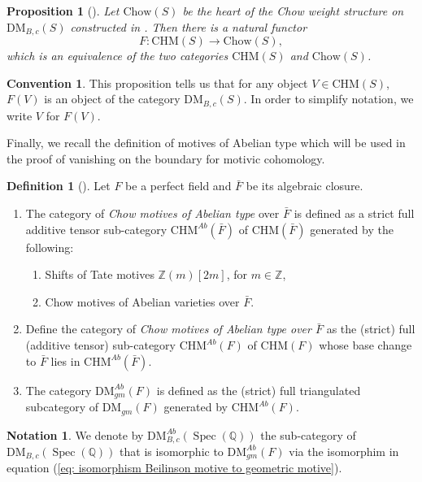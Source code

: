 \documentclass[11pt, a4paper]{amsart}
\theoremstyle{plain}
\newtheorem{proposition}[theorem]{Proposition}
\theoremstyle{definition}
\newtheorem{definition}[theorem]{Definition}
\newtheorem{convention}[theorem]{Convention}
\newtheorem{notation}[theorem]{Notation}
\numberwithin{equation}{section}
\def\QQ{\mathbb{Q}}
\def\ZZ{\mathbb{Z}}
\DeclareMathOperator{\Spec}{Spec}
\begin{document}
 \begin{proposition}[{\cite[Theorem 3.17]{Jin16}}]
 \label{Prop: Jin}
 Let $\mathrm{Chow}(S)$ be the heart of the Chow weight structure on $\mathrm{DM}_{B,c}(S)$ constructed in \textnormal{\cite[Th\'{e}or\`{e}me 3.3.]{Hebert10}}. Then there is a natural functor 
 \[
        F \colon \mathrm{CHM}(S) \rightarrow \mathrm{Chow}(S),
 \]
 which is an equivalence of the two categories $\mathrm{CHM}(S)$ and $\mathrm{Chow}(S)$. 
 \end{proposition}

 \begin{convention}
     This proposition tells us that for any object $V \in \mathrm{CHM}(S)$, $F(V)$ is an object of the category $\mathrm{DM}_{B,c}(S)$. In order to simplify notation, we write $V$ for $F(V)$. 
 \end{convention}

 Finally, we recall the definition of motives of Abelian type which will be used in the proof of vanishing on the boundary for motivic cohomology.
 \begin{definition}[{\cite[Definition 1.1]{Wild_15}}]
     Let $F$ be a perfect field and $\bar{F}$ be its algebraic closure. 
     \begin{enumerate}
         \item  The category of \textit{Chow motives of Abelian type} over $\bar{F}$ is defined as a strict full additive tensor sub-category $\mathrm{CHM}^{Ab}(\bar{F})$ of $\mathrm{CHM}(\bar{F})$ generated by the following: 
         \begin{enumerate}
             \item Shifts of Tate motives $\ZZ(m)[2m]$, for $m \in \ZZ$, 
             \item Chow motives of Abelian varieties over $\bar{F}$. 
         \end{enumerate}
         \item Define the category of \textit{Chow motives of Abelian type over $\bar{F}$} as the (strict) full (additive tensor) sub-category $\mathrm{CHM}^{Ab}(F)$ of $\mathrm{CHM}(F)$ whose base change to $\bar{F}$ lies in $\mathrm{CHM}^{Ab}(\bar{F})$. 
         \item The category $\mathrm{DM}_{gm}^{Ab}(F)$ is defined as the (strict) full triangulated subcategory of $\mathrm{DM}_{gm}(F)$ generated by $\mathrm{CHM}^{Ab}(F)$. 
     \end{enumerate}
 \end{definition}

 \begin{notation}
    We denote by $\mathrm{DM}_{B, c}^{Ab}(\Spec (\QQ))$ the sub-category of $\mathrm{DM}_{B, c}(\Spec (\QQ))$ that is isomorphic to $\mathrm{DM}_{gm}^{Ab}(F)$ via the isomorphim in equation (\ref{eq: isomorphism Beilinson motive to geometric motive}).
 \end{notation}
\end{document}
